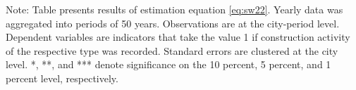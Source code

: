 \begin{table}[htbp]
\begin{tabular}{lcccc}
      
   \end{tabular}
   
   \par \raggedright 
   Note: Table presents results of estimation equation \eqref{eq:sw22}. Yearly data was aggregated into periods of 50 years. Observations are at the city-period  level. Dependent variables are indicators that take the value 1 if  construction activity of the respective type was recorded. Standard errors are  clustered at the city level. *, **, and *** denote significance on the 10 percent, 5 percent, and 1 percent  level, respectively.
\end{table}
